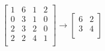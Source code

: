 \[
\left[
\begin{array}{cc|cc}
1 & 6 & 1 & 2 \\
0 & 3 & 1 & 0 \\
\hline
2 & 3 & 2 & 0 \\
2 & 2 & 4 & 1 \\
\end{array}
\right]
\longrightarrow
\left[
\begin{array}{c|c}
6 & 2 \\
\hline
3 & 4 \\
\end{array}
\right]
\]
